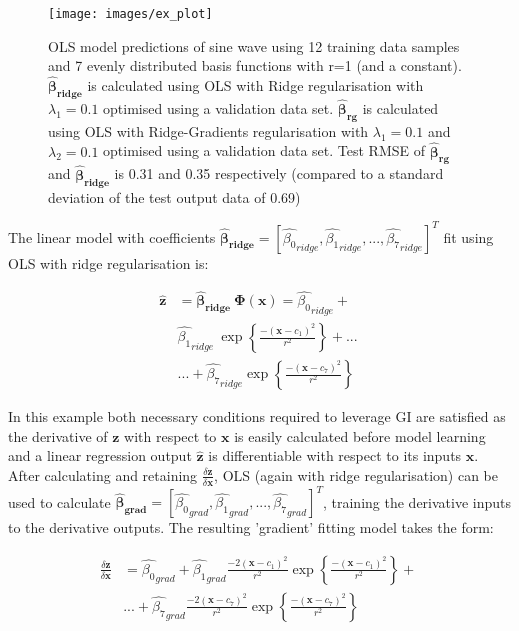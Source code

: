 \documentclass{article}
\begin{document}
\begin{figure}[hbt!]
\centering
\hbox{\hspace{-2em}\texttt{[image: images/ex\_plot]}}
\caption{OLS model predictions of sine wave using 12 training data samples and 7 evenly distributed basis functions with r=1 (and a constant).  $\boldsymbol{\hat{\beta}_{ridge}}$ is calculated using OLS with Ridge regularisation with $\lambda_1 = 0.1$ optimised using a validation data set. $\boldsymbol{\hat{\beta}_{rg}}$ is calculated using OLS with Ridge-Gradients regularisation with $\lambda_1 = 0.1$ and $\lambda_2 = 0.1$ optimised using a validation data set. Test RMSE of $\boldsymbol{\hat{\beta}_{rg}}$ and $\boldsymbol{\hat{\beta}_{ridge}}$ is 0.31 and 0.35 respectively (compared to a standard deviation of the test output data of 0.69)} 
\label{sine_wave}
\end{figure}

The linear model with coefficients $ \boldsymbol{\hat{\beta}_{ridge}} = [\hat{\beta_0}_{ridge},  \hat{\beta_1}_{ridge}, ... , \hat{\beta_7}_{ridge}]^T$ fit using OLS with ridge regularisation is:

\begin{equation}
	\begin{split}
	\label{lin_model}
	\hat{\mathbf{z}} &= \boldsymbol{\hat{\beta}_{ridge}} \ \boldsymbol{\Phi(x)}  = \hat{\beta_0}_{ridge} + \ 
	\\
	& \hat{\beta_1}_{ridge} \ \exp \left \{ \frac{-(\mathbf{x} - c_1)^2}{r^2} \right \} + ... \ 
	\\
	&... + \hat{\beta_7}_{ridge} \exp \left \{  \frac{-(\mathbf{x} - c_7)^2}{r^2}\right \}
	\end{split}
\end{equation}

In this example both necessary conditions required to leverage GI are satisfied as the derivative of $\mathbf{z}$ with respect to $\mathbf{x}$ is easily calculated before model learning and a linear regression output $\mathbf{\hat{z}}$ is differentiable with respect to its inputs $\mathbf{x}$. After calculating and retaining $\frac{\delta \mathbf{z}}{\delta \mathbf{x}}$, OLS (again with ridge regularisation) can be used to calculate $\boldsymbol{\hat{\beta}_{grad}} =  [\hat{\beta_0}_{grad},  \hat{\beta_1}_{grad}, ... , \hat{\beta_7}_{grad}]^T$, training the derivative inputs to the derivative outputs. The resulting 'gradient' fitting model takes the form:

\begin{equation}
	\label{beta_grad}
	\begin{split}
\frac{\delta \mathbf{\hat{z}}}{\delta \mathbf{x} } &= \hat{\beta_0}_{grad} +
 \hat{\beta_1}_{grad} \frac{-2(\mathbf{x}  - c_1)^2}{r^2} \exp \left \{ \frac{-(\mathbf{x} - c_1)^2}{r^2} \right \} + \
\\
&... + \hat{\beta_7}_{grad} \frac{-2(\mathbf{x} - c_7)^2}{r^2} \exp \left \{ \frac{-(\mathbf{x}  - c_7)^2}{r^2} \right \}
	\end{split}
\end{equation}
\end{document}
